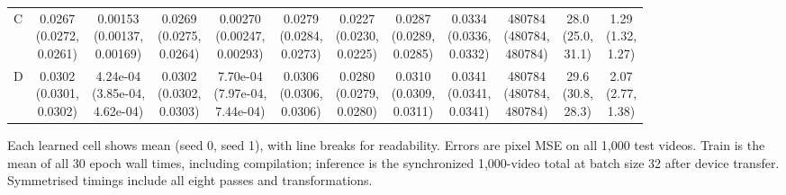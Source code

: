 \documentclass[
  10pt,
  a4paper,
]{article}
\begin{document}
\begin{landscape}
\begin{center}
{\begin{tabular}{lccccccccccc}
C & \makecell[c]{0.0267\\(0.0272,\\0.0261)} & \makecell[c]{0.00153\\(0.00137,\\0.00169)} & \makecell[c]{0.0269\\(0.0275,\\0.0264)} & \makecell[c]{0.00270\\(0.00247,\\0.00293)} & \makecell[c]{0.0279\\(0.0284,\\0.0273)} & \makecell[c]{0.0227\\(0.0230,\\0.0225)} & \makecell[c]{0.0287\\(0.0289,\\0.0285)} & \makecell[c]{0.0334\\(0.0336,\\0.0332)} & \makecell[c]{480784\\(480784,\\480784)} & \makecell[c]{28.0\\(25.0,\\31.1)} & \makecell[c]{1.29\\(1.32,\\1.27)} \\
D & \makecell[c]{0.0302\\(0.0301,\\0.0302)} & \makecell[c]{4.24e-04\\(3.85e-04,\\4.62e-04)} & \makecell[c]{0.0302\\(0.0302,\\0.0303)} & \makecell[c]{7.70e-04\\(7.97e-04,\\7.44e-04)} & \makecell[c]{0.0306\\(0.0306,\\0.0306)} & \makecell[c]{0.0280\\(0.0279,\\0.0280)} & \makecell[c]{0.0310\\(0.0309,\\0.0311)} & \makecell[c]{0.0341\\(0.0341,\\0.0341)} & \makecell[c]{480784\\(480784,\\480784)} & \makecell[c]{29.6\\(30.8,\\28.3)} & \makecell[c]{2.07\\(2.77,\\1.38)} \\
\bottomrule
\end{tabular}}
\end{center}
Each learned cell shows mean (seed 0, seed 1), with line breaks for readability. Errors are pixel MSE on all 1,000 test videos. Train is the mean of all 30 epoch wall times, including compilation; inference is the synchronized 1,000-video total at batch size 32 after device transfer. Symmetrised timings include all eight passes and transformations.
\end{landscape}
\end{document}
